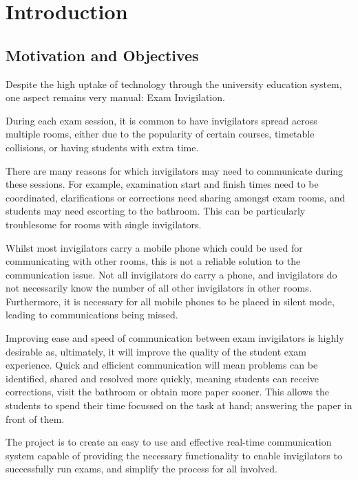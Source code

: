 
\chapter{Introduction}

\section{Motivation and Objectives}

Despite the high uptake of technology through the university education system, one aspect remains very manual: Exam Invigilation.

During each exam session, it is common to have invigilators spread across multiple rooms, either due to the popularity of certain courses, timetable collisions, or having students with extra time.

There are many reasons for which invigilators may need to communicate during these sessions.  For example, examination start and finish times need to be coordinated, clarifications or corrections need sharing amongst exam rooms, and students may need escorting to the bathroom.  This can be particularly troublesome for rooms with single invigilators.

Whilst most invigilators carry a mobile phone which could be used for communicating with other rooms, this is not a reliable solution to the communication issue.  Not all invigilators do carry a phone, and invigilators do not necessarily know the number of all other invigilators in other rooms.  Furthermore, it is necessary for all mobile phones to be placed in silent mode, leading to communications being missed.

Improving ease and speed of communication between exam invigilators is highly desirable as, ultimately, it will improve the quality of the student exam experience.  Quick and efficient communication will mean problems can be identified, shared and resolved more quickly, meaning students can receive corrections, visit the bathroom or obtain more paper sooner.  This allows the students to spend their time focussed on the task at hand; answering the paper in front of them.

The project is to create an easy to use and effective real-time communication system capable of providing the necessary functionality to enable invigilators to successfully run exams, and simplify the process for all involved.
